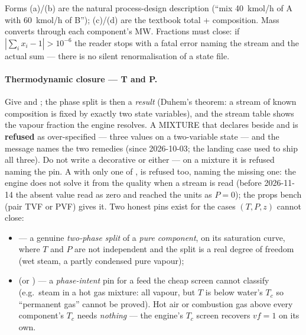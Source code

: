 \documentclass[11pt,a4paper]{article}
\begin{document}
Forms (a)/(b) are the natural process-design description (``mix
40~kmol/h of A with 60~kmol/h of B''); (c)/(d) are the textbook total +
composition.  Mass converts through each component's MW.  Fractions
must close: if $|\sum_i x_i - 1| > 10^{-6}$ the reader stops with a
fatal error naming the stream and the actual sum --- there is no silent
renormalisation of a state file.

\paragraph{Thermodynamic closure --- T and P.}  Give  and
; the phase split is then a \emph{result} (Duhem's theorem: a
stream of known composition is fixed by exactly two state variables),
and the stream table shows the vapour fraction the engine resolves.  A
MIXTURE that declares  beside  and 
is \textbf{refused} as over-specified --- three values on a two-variable
state --- and the message names the two remedies (since 2026-10-03; the
landing case  used to ship all three).  Do not write a
decorative  or  either --- on a mixture
it is refused naming the  pin.  A  with
only one of ,  is refused too, naming the missing one: the
engine does not solve it from the quality when a stream is read (before
2026-11-14 the absent value read as zero and reached the units as
$P = 0$); the props bench  (pair TVF or PVF) gives it.
Two honest pins exist for the
cases $(T,P,z)$ cannot close:

\begin{itemize}[leftmargin=*,nosep,topsep=2pt]
  \item {} --- a genuine \emph{two-phase split}
        of a \emph{pure component}, on its saturation curve, where $T$
        and $P$ are not independent and the split is a real degree of
        freedom (wet steam, a partly condensed pure vapour);
  \item {} (or ) --- a
        \emph{phase-intent} pin for a feed the cheap screen cannot
        classify (e.g.\ steam in a hot gas mixture: all vapour, but $T$
        is below water's $T_c$ so ``permanent gas'' cannot be proved).
        Hot air or combustion gas above every component's $T_c$ needs
        \emph{nothing} --- the engine's $T_c$ screen recovers
        $vf = 1$ on its own.
\end{itemize}
\end{document}
